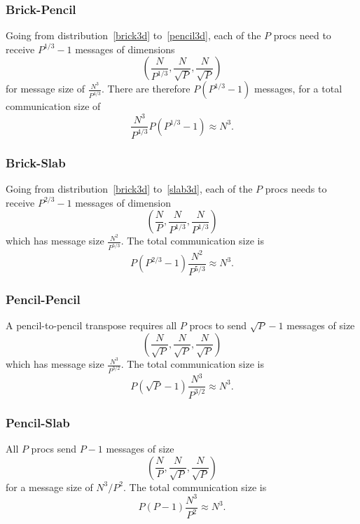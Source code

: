 \documentclass[12pt]{article}
\renewcommand{\(}{\left(}
\renewcommand{\)}{\right)}
\begin{document}
\subsubsection{Brick-Pencil}
Going from distribution~\eqref{brick3d} to~\eqref{pencil3d}, each of
the $P$ procs need to receive $P^{1/3}-1$ messages of dimensions 
\begin{dmath}
  \left(\frac{N}{P^{1/3}}, \frac{N}{\sqrt{P}}, \frac{N}{\sqrt{P}} \right)
\end{dmath}
for message size of $\frac{N^3}{P^{4/3}}$.  There are therefore
$P(P^{1/3}-1)$ messages, for a total communication size of
\begin{dmath}
  \frac{N^3}{P^{4/3}} P(P^{1/3}-1) \approx N^3.
\end{dmath}

\subsubsection{Brick-Slab}
Going from distribution~\eqref{brick3d} to~\eqref{slab3d}, each of the
$P$ procs needs to receive $P^{2/3}-1$ messages of dimension
\begin{dmath}
  \left(\frac{N}{P}, \frac{N}{P^{1/3}}, \frac{N}{P^{1/3}} \right)
\end{dmath}
which has message size $\frac{N^2}{P^{5/3}}$.  The total communication
  size is
\begin{dmath}
  P\(P^{2/3}-1\) \frac{N^2}{P^{5/3}} \approx N^3.
\end{dmath}

\subsubsection{Pencil-Pencil}
A pencil-to-pencil transpose requires all $P$ procs to send
$\sqrt{P}-1$ messages of size
\begin{dmath}
  \left(\frac{N}{\sqrt{P}}, \frac{N}{\sqrt{P}}, \frac{N}{\sqrt{P}} \right)
\end{dmath}
which has message size $\frac{N^3}{P^{3/2}}$.  The total communication
size is
\begin{dmath}
  P \(\sqrt{P}-1\) \frac{N^3}{P^{3/2}} \approx N^3.
\end{dmath}

\subsubsection{Pencil-Slab}
All $P$ procs send $P-1$ messages of size
\begin{dmath}
  \left(\frac{N}{P}, \frac{N}{\sqrt{P}}, \frac{N}{\sqrt{P}} \right)
\end{dmath}
for a message size of $N^3/P^2$.  The total communication size is
\begin{dmath}
  P \(P-1\) \frac{N^3}{P^2} \approx N^3.
\end{dmath}
\end{document}
